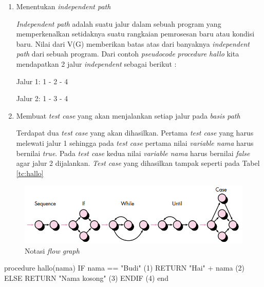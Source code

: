\begin{enumerate}[
leftmargin=0pt, itemindent=20pt,
labelwidth=15pt, labelsep=5pt, listparindent=0.7cm,
align=left]
\item Menentukan \emph{independent path}

  \emph{Independent path} adalah suatu jalur dalam sebuah program yang
  memperkenalkan setidaknya suatu rangkaian pemrosesan baru atau
  kondisi baru. Nilai dari V(G) memberikan batas atas dari banyaknya
  \emph{independent path} dari sebuah program. Dari contoh
  \emph{pseudocode} \emph{procedure hallo} kita mendapatkan 2 jalur
  \emph{independent} sebagai berikut : \par\null\par

  Jalur 1: 1 - 2 - 4 \par
  Jalur 2: 1 - 3 - 4

\item Membuat \emph{test case} yang akan menjalankan setiap jalur pada
  \emph{basis path}

  Terdapat dua \emph{test case} yang akan dihasilkan. Pertama
  \emph{test case} yang harus melewati jalur 1 sehingga pada \emph{test
    case} pertama nilai \emph{variable nama} harus bernilai
  \emph{true}. Pada \emph{test case} kedua nilai \emph{variable nama}
  harus bernilai \emph{false} agar jalur 2 dijalankan. \emph{Test case}
  yang dihasilkan tampak seperti pada Tabel
  \ref{tc:hallo}

\end{enumerate}

\begin{figure}[H]
  \centering
  \includegraphics[width=.8\linewidth]{img/notasi-flow-graph}
  \caption{Notasi \emph{flow graph} \parencite{presman2010software}}
  \label{fig:notasi-flow-graph}
\end{figure}


\begin{center}
\begin{minipage}{0.8\textwidth}
\begin{code}
\begin{ignasicblock}[title=hallo,minted language=text]
procedure hallo(nama)
   IF nama == "Budi"          (1)
      RETURN "Hai" + nama     (2)
   ELSE
      RETURN "Nama kosong"    (3)
   ENDIF                      (4)
end
\end{ignasicblock}
\label{ps:hallo}
\end{code}
\end{minipage}
\end{center}


